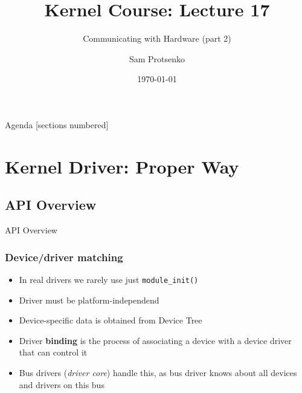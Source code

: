 \documentclass[aspectratio=169,usenames,dvipsnames]{beamer}
\title{Kernel Course: Lecture 17}
\subtitle{Communicating with Hardware (part 2)}
\date{\today}
\author{Sam Protsenko}
\institute{GlobalLogic}
\newcounter{cont}
\begin{document}

\maketitle

\begin{frame}{Agenda}
  [sections numbered]
  \tableofcontents[hideallsubsections]
\end{frame}

\section{Kernel Driver: Proper Way}

\subsection{API Overview}

\begin{frame}[standout]
  API Overview
\end{frame}

\begin{frame}
  \frametitle{Device/driver matching}
  \begin{itemize}
    \item In real drivers we rarely use just \texttt{module\_init()}
    \item Driver must be platform-independend
    \item Device-specific data is obtained from Device Tree
    \item Driver \textbf{binding} is the process of associating a device with
          a device driver that can control it
    \item Bus drivers (\textit{driver core}) handle this, as bus driver knows
          about all devices and drivers on this bus
  \end{itemize}
\end{frame}
\end{document}
